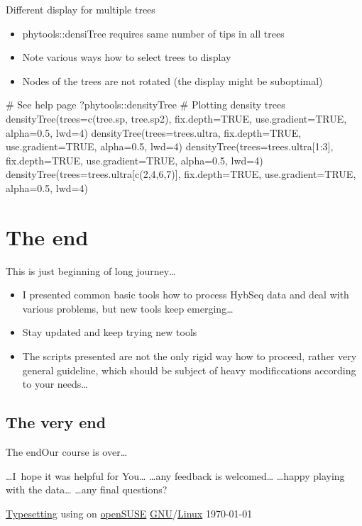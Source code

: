\documentclass[compress, ucs, xelatex, 11pt, xcolor=x11names, aspectratio=169,
	hyperref={
		bookmarks=true,
		unicode=true,
		colorlinks=true,
		pdftitle={HybSeq course},
		plainpages=false,
		pdfauthor={Vojtech Zeisek},
		pdfsubject={Practical processing of HybSeq target enrichment sequencing data on computing grids like MetaCentrum},
		pdfcreator={XeLaTeX},
		pdfkeywords={BASH, command line, GNU, HybSeq, Linux, MetaCentrum, sequencing shell, target enrichment},
		linkcolor=Turquoise4, %
		anchorcolor=DodgerBlue4, %
		citecolor=DodgerBlue4, %
		filecolor=DodgerBlue4, %
		menucolor=Tan4, %
		urlcolor=DarkOliveGreen4, %
		pdftex},
	url={hyphens, lowtilde} %
	]{beamer}
\renewcommand{\texttt}[1]{\colorbox{Cornsilk2}{{\ttfamily #1}}}
\begin{document}
\begin{frame}[fragile]{Different display for multiple trees}
	\begin{itemize}
		\item \texttt{phytools::densiTree} requires same number of tips in all trees
		\item Note various ways how to select trees to display
		\item Nodes of the trees are not rotated (the display might be suboptimal)
	\end{itemize}
	\begin{spluscode}
    # See help page
    ?phytools::densityTree
    # Plotting density trees
    densityTree(trees=c(tree.sp, tree.sp2), fix.depth=TRUE, use.gradient=TRUE,
      alpha=0.5, lwd=4)
    densityTree(trees=trees.ultra, fix.depth=TRUE, use.gradient=TRUE,
      alpha=0.5, lwd=4)
    densityTree(trees=trees.ultra[1:3], fix.depth=TRUE, use.gradient=TRUE,
      alpha=0.5, lwd=4)
    densityTree(trees=trees.ultra[c(2,4,6,7)], fix.depth=TRUE,
      use.gradient=TRUE, alpha=0.5, lwd=4)
	\end{spluscode}
\end{frame}

\section{The end}

\begin{frame}{This is just beginning of long journey\ldots}
	\begin{itemize}
		\item I presented common basic tools how to process HybSeq data and deal with various problems, but new tools keep emerging\ldots
		\item Stay updated and keep trying new tools
		\item The scripts presented are not the only rigid way how to proceed, rather very general guideline, which should be subject of heavy modificcations according to your needs\ldots
	\end{itemize}
\end{frame}

\subsection{The very end}

\begin{frame}{The end}{Our course is over\ldots}
	\begin{center}
		\ldots I~hope it was helpful for You\ldots
		\vfill
		\ldots any feedback is welcomed\ldots
		\vfill
		\ldots happy playing with the data\ldots
		\vfill
		\ldots any final questions?
		\vfill
	\end{center}
	\vfill
	\begin{flushright}
		\begin{tiny}
		\href{https://en.wikipedia.org/wiki/XeTeX}{Typesetting} using \XeLaTeX{ }on \href{https://www.opensuse.org/}{openSUSE} \href{https://en.wikipedia.org/wiki/GNU}{GNU}/\href{https://en.wikipedia.org/wiki/Linux}{Linux} \today
		\end{tiny}
	\end{flushright}
\end{frame}
\end{document}
